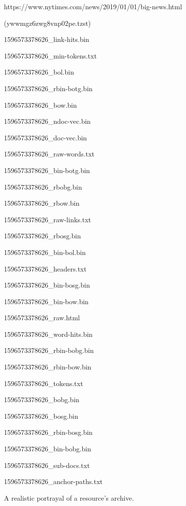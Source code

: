 \begin{figure}
\begin{nodeC}
	\item{https://www.nytimes.com/news/2019/01/01/big-news.html}
	\item{(ywwmgz6zwg8vnp02pe.tzst)}
	\begin{nodeC}
		\item{1596573378626\_link-hits.bin}
		\item{1596573378626\_min-tokens.txt}
		\item{1596573378626\_bol.bin}
		\item{1596573378626\_rbin-botg.bin}
		\item{1596573378626\_bow.bin}
		\item{1596573378626\_ndoc-vec.bin}
		\item{1596573378626\_doc-vec.bin}
		\item{1596573378626\_raw-words.txt}
		\item{1596573378626\_bin-botg.bin}
		\item{1596573378626\_rbobg.bin}
		\item{1596573378626\_rbow.bin}
		\item{1596573378626\_raw-links.txt}
		\item{1596573378626\_rbosg.bin}
		\item{1596573378626\_bin-bol.bin}
		\item{1596573378626\_headers.txt}
		\item{1596573378626\_bin-bosg.bin}
		\item{1596573378626\_bin-bow.bin}
		\item{1596573378626\_raw.html}
		\item{1596573378626\_word-hits.bin}
		\item{1596573378626\_rbin-bobg.bin}
		\item{1596573378626\_rbin-bow.bin}
		\item{1596573378626\_tokens.txt}
		\item{1596573378626\_bobg.bin}
		\item{1596573378626\_bosg.bin}
		\item{1596573378626\_rbin-bosg.bin}
		\item{1596573378626\_bin-bobg.bin}
		\item{1596573378626\_sub-docs.txt}
		\item{1596573378626\_anchor-paths.txt}
	\end{nodeC}
\end{nodeC}
\caption{A realistic portrayal of a resource's archive.}
\label{real-arc}
\end{figure}